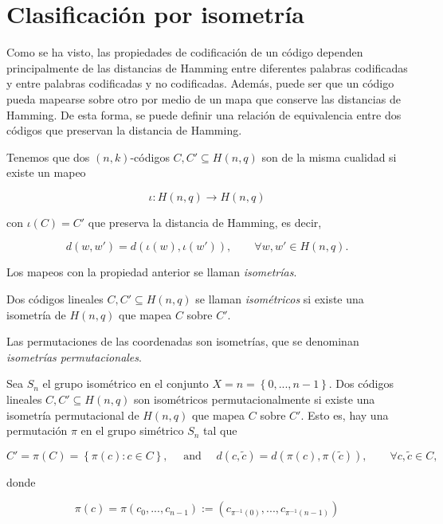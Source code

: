 \section{Clasificación por isometría}

Como se ha visto, las propiedades de codificación de un código dependen principalmente de las distancias de Hamming entre diferentes palabras codificadas y entre palabras codificadas y no codificadas. Además, puede ser que un código pueda mapearse sobre otro por medio de un mapa que conserve las distancias de Hamming. De esta forma, se puede definir una relación de equivalencia entre dos códigos que preservan la distancia de Hamming.

Tenemos que dos $(n,k)$-códigos $C, C' \subseteq H(n,q)$ son de la misma cualidad si existe un mapeo

$$\iota : H(n,q) \rightarrow H(n,q)$$

con $\iota(C) = C'$ que preserva la distancia de Hamming, es decir, 

$$d(w,w') = d(\iota (w), \iota(w')), \qquad \forall w,w' \in H(n,q).$$

Los mapeos con la propiedad anterior se llaman \emph{isometrías}.

\begin{definition}
    Dos códigos lineales $C, C' \subseteq H(n,q)$ se llaman \emph{isométricos} si existe una isometría de $H(n,q)$ que mapea $C$ sobre $C'$.
\end{definition}

Las permutaciones de las coordenadas son isometrías, que se denominan \emph{isometrías permutacionales}.

\begin{definition}
    Sea $S_n$ el grupo isométrico en el conjunto $X = n = \left\{ 0,..., n-1 \right\}$. Dos códigos lineales $C, C' \subseteq H(n,q)$ son isométricos permutacionalmente si existe una isometría permutacional de $H(n,q)$ que mapea $C$ sobre $C'$. Esto es, hay una permutación $\pi$ en el grupo simétrico $S_n$ tal que 

    $$ C' = \pi (C) = \left\{ \pi(c) : c \in C \right\}, \quad \text{ and } \quad d(c, \tilde{c}) = d(\pi(c), \pi(\tilde{c})), \qquad \forall c,\tilde{c} \in C,$$ 

    donde
    
    $$\pi(c) = \pi(c_0,...,c_{n-1}) := \left( c_{\pi ^{-1} (0)}, ..., c_{\pi ^{-1} (n-1)} \right)$$
\end{definition}
